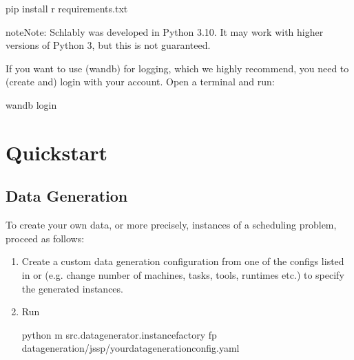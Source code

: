 \documentclass[letterpaper,10pt,english]{sphinxmanual}
\begin{document}
\begin{sphinxVerbatim}[commandchars=\\\{\}]
pip install \PYGZhy{}r requirements.txt
\end{sphinxVerbatim}

\begin{sphinxadmonition}{note}{Note:}
\sphinxAtStartPar
Schlably was developed in Python 3.10. It may work with higher versions of Python 3, but this is not guaranteed.
\end{sphinxadmonition}

\sphinxAtStartPar
If you want to use  (wandb) for logging, which we highly recommend,
you need to (create and) login with your account. Open a terminal and run:

\begin{sphinxVerbatim}[commandchars=\\\{\}]
wandb login
\end{sphinxVerbatim}


\section{Quickstart}
\label{\detokenize{quickstart:quickstart}}\label{\detokenize{quickstart::doc}}

\subsection{Data Generation}
\label{\detokenize{quickstart:data-generation}}
\sphinxAtStartPar
To create your own data, or more precisely, instances of a scheduling problem, proceed as follows:
\begin{enumerate}
%
\item {} 
\sphinxAtStartPar
Create a custom data generation configuration from one of the configs listed in  or  (e.g. change number of machines, tasks, tools, runtimes etc.) to specify the generated instances.

\item {} 
\sphinxAtStartPar
Run

\begin{sphinxVerbatim}[commandchars=\\\{\}]
python \PYGZhy{}m src.data\PYGZus{}generator.instance\PYGZus{}factory \PYGZhy{}fp data\PYGZus{}generation/jssp/\PYGZlt{}your\PYGZus{}data\PYGZus{}generation\PYGZus{}config\PYGZgt{}.yaml
\end{sphinxVerbatim}

\end{enumerate}
\end{document}
